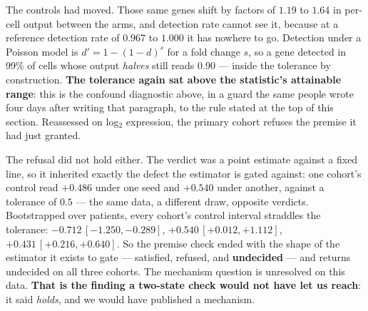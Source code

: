 The controls had moved. Those same genes shift by factors of $1.19$ to $1.64$ in
per-cell output between the arms, and detection rate cannot see it, because at a
reference detection rate of $0.967$ to $1.000$ it has nowhere to go. Detection
under a Poisson model is $d' = 1 - (1-d)^{s}$ for a fold change $s$, so a gene
detected in 99\% of cells whose output \emph{halves} still reads $0.90$ --- inside
the tolerance by construction. \textbf{The tolerance again sat above the
statistic's attainable range}: this is the confound diagnostic above, in a guard
the same people wrote four days after writing that paragraph, to the rule stated
at the top of this section. Reassessed on log$_2$ expression, the primary
cohort refuses the premise it had just granted.

The refusal did not hold either. The verdict was a point estimate against a
fixed line, so it inherited exactly the defect the estimator is gated against:
one cohort's control read $+0.486$ under one seed and $+0.540$ under another,
against a tolerance of $0.5$ --- the same data, a different draw, opposite
verdicts. Bootstrapped over patients, every cohort's control interval straddles
the tolerance: $-0.712\,[-1.250, -0.289]$, $+0.540\,[+0.012, +1.112]$,
$+0.431\,[+0.216, +0.640]$. So the premise check ended with the shape of the
estimator it exists to gate --- satisfied, refused, and \textbf{undecided} --- and
returns undecided on all three cohorts. The mechanism question is unresolved on
this data. \textbf{That is the finding a two-state check would not have let us
reach}: it said \emph{holds}, and we would have published a mechanism.

